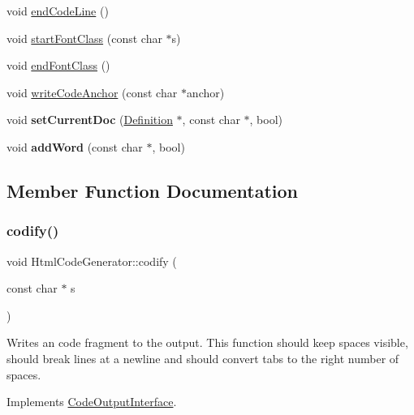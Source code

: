 \begin{DoxyCompactItemize}
void \mbox{\hyperlink{class_html_code_generator_ab0909b2a97301c8da4fcbf83831c84b3}{end\+Code\+Line}} ()
\item 
void \mbox{\hyperlink{class_html_code_generator_ae7eaca4c34eeb6bf1aeaf0ac5ce4257b}{start\+Font\+Class}} (const char $\ast$s)
\item 
void \mbox{\hyperlink{class_html_code_generator_a8efe5c697dc169b24b5e7da7cf54305e}{end\+Font\+Class}} ()
\item 
void \mbox{\hyperlink{class_html_code_generator_a89ec8d4b9eb2b5162b4d9a7cab209b4a}{write\+Code\+Anchor}} (const char $\ast$anchor)
\item 
\mbox{\label{class_html_code_generator_a6ac7fde67764c26857967eed883eb36b}} 
void {\bfseries set\+Current\+Doc} (\mbox{\hyperlink{class_definition}{Definition}} $\ast$, const char $\ast$, bool)
\item 
\mbox{\label{class_html_code_generator_a589f4d1ffce901b424bcbc0db0808471}} 
void {\bfseries add\+Word} (const char $\ast$, bool)
\end{DoxyCompactItemize}


\subsection{Member Function Documentation}
\mbox{\label{class_html_code_generator_aa482ae62b65a2fd1cc6cda022e88c920}} 
\subsubsection{\texorpdfstring{codify()}{codify()}}
{\footnotesize\ttfamily void Html\+Code\+Generator\+::codify (\begin{DoxyParamCaption}\item[{const char $\ast$}]{s }\end{DoxyParamCaption})\hspace{0.3cm}{\ttfamily [virtual]}}

Writes an code fragment to the output. This function should keep spaces visible, should break lines at a newline and should convert tabs to the right number of spaces. 

Implements \mbox{\hyperlink{class_code_output_interface_aa29a5eedda08596ace50ed5b59c8ae7f}{Code\+Output\+Interface}}.

